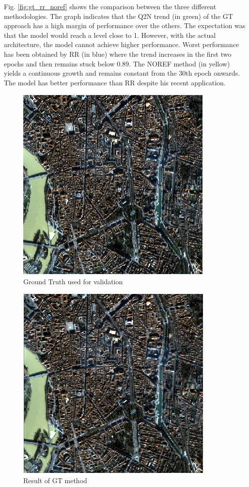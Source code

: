 \documentclass[12pt]{report}
\begin{document}
Fig. \ref{fig:gt_rr_noref} shows the comparison between the three different methodologies. 
The graph indicates that the Q2N trend (in green) of the GT approach has a high margin of performance over the others. The expectation was that the model would reach a level close to 1. However, with the actual architecture, the model cannot achieve higher performance.
Worst performance has been obtained by RR (in blue) where the trend increases in the first two epochs and then remains stuck below 0.89. 
The NOREF method (in yellow) yields a continuous growth and remains constant from the 30th epoch onwards. 
The model has better performance than RR despite his recent application.


\begin{figure}
    \centering
    \includegraphics[scale=.8]{Target.png}
    \caption{Ground Truth used for validation}
    \label{fig:comparison_target}
\end{figure}

\begin{figure}
    \centering
    \includegraphics[scale=.8]{GT.png}
    \caption{Result of GT method}
    \label{fig:comparison_gt}
\end{figure}
\end{document}
